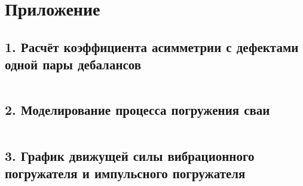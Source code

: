 \nocite{*}

\printbibliography{}

\clearpage

\section*{Приложение}

\subsection*{1. Расчёт коэффициента асимметрии с дефектами одной пары дебалансов}
\inputminted[linenos, fontsize=\footnotesize]{python}{app/acoeff.py}

\subsection*{2. Моделирование процесса погружения сваи}
\inputminted[linenos, fontsize=\footnotesize]{python}{app/main.py}

\subsection*{3. График движущей силы вибрационного погружателя и импульсного погружателя}
\inputminted[linenos, fontsize=\footnotesize]{python}{app/impuls.py}
